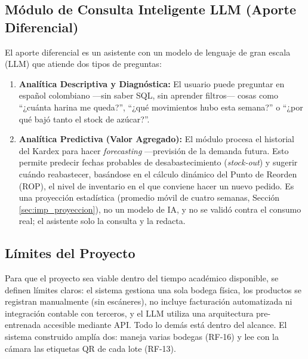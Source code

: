 \subsection{Módulo de Consulta Inteligente LLM (Aporte Diferencial)}
El aporte diferencial es un asistente con un modelo de lenguaje de gran escala (LLM) que atiende dos tipos de preguntas:

\begin{enumerate}
    \item \textbf{Analítica Descriptiva y Diagnóstica:} El usuario puede preguntar en español colombiano ---sin saber SQL, sin aprender filtros--- cosas como ``¿cuánta harina me queda?'', ``¿qué movimientos hubo esta semana?'' o ``¿por qué bajó tanto el stock de azúcar?''.
    \item \textbf{Analítica Predictiva (Valor Agregado):} El módulo procesa el historial del Kardex para hacer \textit{forecasting} ---previsión de la demanda futura. Esto permite predecir fechas probables de desabastecimiento (\textit{stock-out}) y sugerir cuándo reabastecer, basándose en el cálculo dinámico del Punto de Reorden (ROP), el nivel de inventario en el que conviene hacer un nuevo pedido. Es una proyección estadística (promedio móvil de cuatro semanas, Sección \ref{sec:imp_proyeccion}), no un modelo de IA, y no se validó contra el consumo real; el asistente solo la consulta y la redacta.
\end{enumerate}

\subsection{Límites del Proyecto}
Para que el proyecto sea viable dentro del tiempo académico disponible, se definen límites claros: el sistema gestiona una sola bodega física, los productos se registran manualmente (sin escáneres), no incluye facturación automatizada ni integración contable con terceros, y el LLM utiliza una arquitectura pre-entrenada accesible mediante API. Todo lo demás está dentro del alcance. El sistema construido amplía dos: maneja varias bodegas (RF-16) y lee con la cámara las etiquetas QR de cada lote (RF-13).
